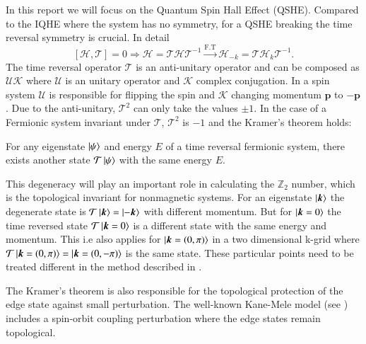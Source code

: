 \documentclass[a4paper,11pt]{report}
\begin{document}
In this report we will focus on the 
Quantum Spin Hall Effect (QSHE). Compared to the IQHE where the system has no symmetry, for a QSHE breaking the time reversal
symmetry is crucial. In detail
\begin{equation}
 \left[\mathcal{H}, \mathcal{T}\right] = 0 \Rightarrow \mathcal{H} = \mathcal{T}\mathcal{H}\mathcal{T}^{-1} \xrightarrow{\mathrm{F.T}}
 \mathcal{H}_{-k} = \mathcal{T}\mathcal{H}_{k}\mathcal{T}^{-1}.
\end{equation}
The time reversal operator $\mathcal{T}$ is an anti-unitary operator and can be composed as $\mathcal{U}\mathcal{K}$ where $\mathcal{U}$ is an unitary
operator and $\mathcal{K}$ complex conjugation. In a spin system $\mathcal{U}$ is responsible for flipping the spin and $\mathcal{K}$ changing momentum
$\bm{p}$ to $-\bm{p}$. Due to the anti-unitary, $\mathcal{T}^2$ can only take the values $\pm 1$. In the case of a Fermionic 
system invariant under $\mathcal{T}$, $\mathcal{T}^2$ is $-1$ and the Kramer's theorem holds: 
\begin{theorem}
For any eigenstate $\ket{\psi}$ and energy $E$ of a 
time reversal fermionic system, there exists another state $\mathcal{T}\ket{\psi}$ with the same energy $E$.
\end{theorem}
This degeneracy will play an important role in calculating the $\mathds{Z}_2$ number, which is the topological invariant for nonmagnetic systems. 
For an eigenstate $\ket{\bm{k}}$ the degenerate state is 
$\mathcal{T}\ket{\bm{k}} = \ket{-\bm{k}}$ with different momentum. But for $\ket{\bm{k} = 0}$ the time reversed state $\mathcal{T}\ket{\bm{k} = 0}$
is a different state with the same energy and momentum. This i.e also applies for $\ket{\bm{k} = (0,\pi)}$ in a two dimensional k-grid where
$\mathcal{T}\ket{\bm{k} = (0,\pi)} = \ket{\bm{k} = (0,-\pi)}$ is the same state. These particular points need to be treated different in the
method described in . 

The Kramer's theorem is also responsible for the topological protection of the edge state against small
perturbation. The well-known Kane-Mele model (see ) includes a spin-orbit coupling perturbation where the edge states remain
topological.
\end{document}
